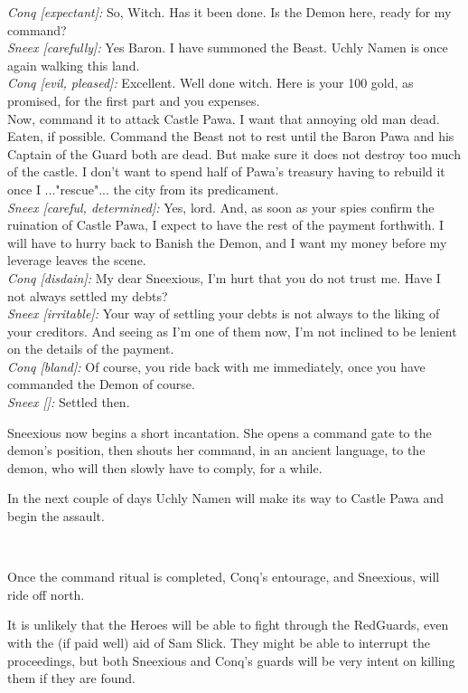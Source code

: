 \begin{readoutloud}
\emph{Conq [expectant]:} So, Witch. Has it been done. Is the Demon here, ready for my command? \\
\emph{Sneex [carefully]:} Yes Baron. I have summoned the Beast. Uchly Namen is once again walking this land. \\
\emph{Conq [evil, pleased]:} Excellent. Well done witch. Here is your 100 gold, as promised, for the first part and you expenses. \\
Now, command it to attack Castle Pawa. I want that annoying old man dead. Eaten, if possible. Command the Beast not to rest until the Baron Pawa and his Captain of the Guard both are dead. But make sure it does not destroy too much of the castle. I don't want to spend half of Pawa's treasury having to rebuild it once I ..."rescue"... the city from its predicament. \\
\emph{Sneex [careful, determined]:} Yes, lord. And, as soon as your spies confirm the ruination of Castle Pawa, I expect to have the rest of the payment forthwith. I will have to hurry back to Banish the Demon, and I want my money before my leverage leaves the scene. \\
\emph{Conq [disdain]:} My dear Sneexious, I'm hurt that you do not trust me. Have I not always settled my debts? \\
\emph{Sneex [irritable]:} Your way of settling your debts is not always to the liking of your creditors. And seeing as I'm one of them now, I'm not inclined to be lenient on the details of the payment. \\
\emph{Conq [bland]:} Of course, you ride back with me immediately, once you have commanded the Demon of course. \\
\emph{Sneex []:} Settled then. \\
\end{readoutloud}

Sneexious now begins a short incantation. She opens a command gate to the demon's position, then shouts her command, in an ancient language, to the demon, who will then slowly have to comply, for a while.

In the next couple of days Uchly Namen will make its way to Castle Pawa and begin the assault.

\

Once the command ritual is completed, Conq's entourage, and Sneexious, will ride off north.

It is unlikely that the Heroes will be able to fight through the RedGuards, even with the (if paid well) aid of Sam Slick. They might be able to interrupt the proceedings, but both Sneexious and Conq's guards will be very intent on killing them if they are found.

